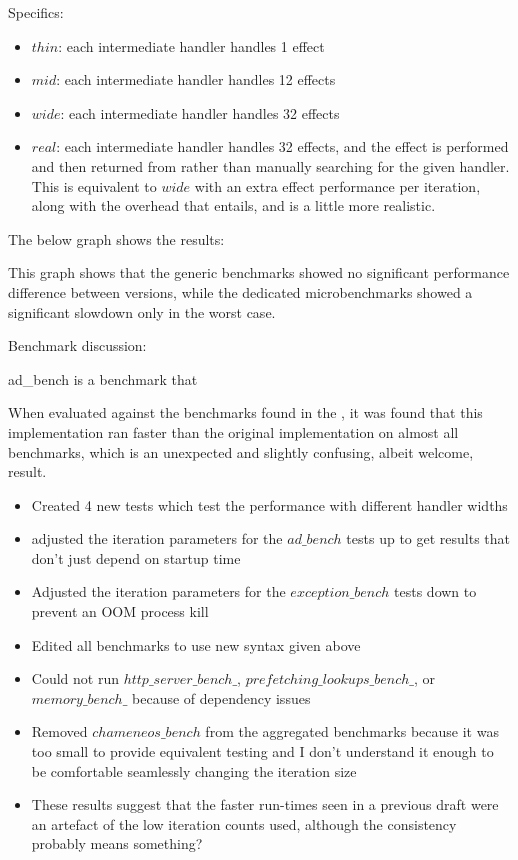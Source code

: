 \documentclass[logo,bsc,singlespacing,parskip,online]{infthesis}
\begin{document}
Specifics: 

\begin{itemize}
    \item $thin$: each intermediate handler handles 1 effect
    \item $mid$: each intermediate handler handles 12 effects
    \item $wide$: each intermediate handler handles 32 effects
    \item $real$: each intermediate handler handles 32 effects, and the effect is performed and then returned from rather than manually searching for the given handler. This is equivalent to $wide$ with an extra effect performance per iteration, along with the overhead that entails, and is a little more realistic.
\end{itemize}

The below graph shows the results:


This graph shows that the generic benchmarks showed no significant performance difference between versions, while the dedicated microbenchmarks showed a significant slowdown only in the worst case.


Benchmark discussion:

ad\_bench is a benchmark that 




When evaluated against the benchmarks found in the , it was found that this implementation ran faster than the original implementation on almost all benchmarks, which is an unexpected and slightly confusing, albeit welcome, result.



\begin{itemize}
 \item Created 4 new tests which test the performance with different handler widths
 \item adjusted the iteration parameters for the $ad\_bench$ tests up to get results that don't just depend on startup time
 \item Adjusted the iteration parameters for the $exception\_bench$ tests down to prevent an OOM process kill
 \item Edited all benchmarks to use new syntax given above
 \item Could not run $http\_server\_bench\_$, $prefetching\_lookups\_bench\_$, or $memory\_bench\_$ because of dependency issues
 \item Removed $chameneos\_bench$ from the aggregated benchmarks because it was too small to provide equivalent testing and I don't understand it enough to be comfortable seamlessly changing the iteration size
 \item These results suggest that the faster run-times seen in a previous draft were an artefact of the low iteration counts used, although the consistency probably means something?
 \end{itemize}
 
\end{document}
